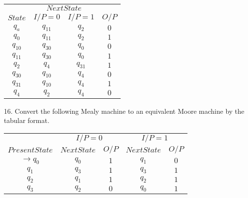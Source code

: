 \documentclass{article}
\begin{document}
  \begin{center}
\begin{tabular}{cccc}
 \hline

 \hline

 \hline

 \hline
 & \multicolumn{2}{c}{$Next State$ }\\
 \cline{2-3}
 $State$ &  $I/P=0$ & $I/P=1$  &  $O/P$\\
\hline
$q_a$    &    $q_11$   &  $q_2$    &  $0$ \\
$q_0$    &    $q_11$   &  $q_2$    &  $1$ \\
$q_10$   &    $q_30$   &  $q_0$    &  $0$ \\
$q_11$   &    $q_30$   &  $q_0$    &  $1$ \\
$q_2$    &    $q_4$    &  $q_31$   &  $1$ \\
$q_30$   &    $q_10$   &  $q_4$    &  $0$ \\
$q_31$   &    $q_10$   &  $q_4$    &  $1$ \\
$q_4$    &    $q_2$    &  $q_4$    &  $0$ \\
 \hline

 \hline

 \hline

 \hline
\end{tabular}
\end{center}

\vspace*{0.3cm}
16. Convert the following Mealy machine to an equivalent Moore machine by the tabular format.\\

\begin{center}
\begin{tabular}{ccccc}
 \hline

 \hline

 \hline

 \hline
 &  \multicolumn{2}{c}{$I/P = 0$ } &  \multicolumn{2}{c}{$I/P = 1$}  \\
  \cline{2-3}                         \cline{4-5}
 $Present State$ &   $Next State$  & $O/P$ &  $Next State$  & $O/P$\\
\hline
$\rightarrow q_0$  &  $q_0$   &  $1$  &  $q_1$  & $0$ \\
$q_1$             &  $q_3$    &  $1$  &  $q_3$  & $1$ \\
$q_2$             &  $q_1$    &  $1$  &  $q_2$  & $1$ \\
$q_3$             &  $q_2$    &  $0$  &  $q_0$  & $1$ \\

 \hline

 \hline

 \hline

 \hline
\end{tabular}
\end{center}
\end{document}
